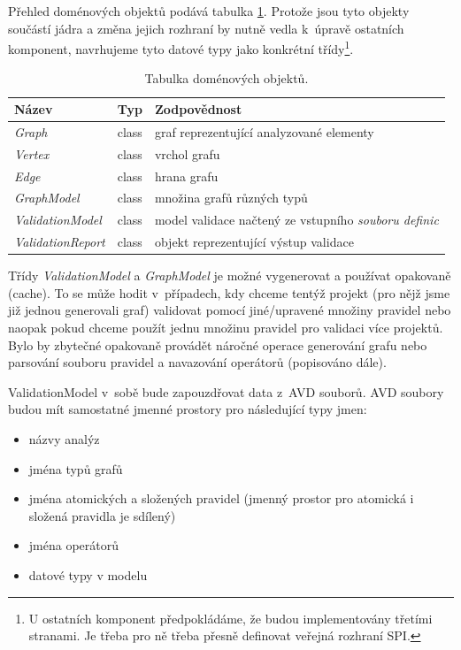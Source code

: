 Přehled doménových objektů podává tabulka \ref{design-domain_object_table}. Protože jsou tyto objekty součástí jádra a změna jejich rozhraní by nutně vedla k~úpravě ostatních komponent, navrhujeme tyto datové typy jako konkrétní třídy\footnote{U ostatních komponent předpokládáme, že budou implementovány třetími stranami. Je třeba pro ně třeba přesně definovat veřejná rozhraní SPI.}.

\begin{table}[h]
  \caption{Tabulka doménových objektů. \label{design-domain_object_table}}
  \begin{center}
    \begin{tabular}{| l | c | p{8cm} |}
      \hline
      \textbf{Název} & \textbf{Typ} & \textbf{Zodpovědnost} \\
      \hline
      \hline
      \emph{Graph} & class & graf reprezentující analyzované elementy \\ \hline
      \emph{Vertex} & class &  vrchol grafu \\ \hline
      \emph{Edge} & class & hrana grafu \\ \hline
      \emph{GraphModel} & class & množina grafů různých typů \\ \hline
      \hline
      \emph{ValidationModel} & class & model validace načtený ze vstupního \emph{souboru definic} \\ \hline
      \hline
      \emph{ValidationReport} & class &  objekt reprezentující výstup validace\\ \hline
    \end{tabular}
  \end{center}

\end{table}

Třídy \emph{ValidationModel} a \emph{GraphModel} je možné vygenerovat a používat opakovaně (cache). To se může hodit v~případech, kdy chceme tentýž projekt (pro nějž jsme již jednou generovali graf) validovat pomocí jiné/upravené množiny pravidel nebo naopak pokud chceme použít jednu množinu pravidel pro validaci více projektů. Bylo by zbytečné opakovaně provádět náročné operace generování grafu nebo parsování souboru pravidel a navazování operátorů (popisováno dále).

ValidationModel v~sobě bude zapouzdřovat data z~AVD souborů. AVD soubory budou mít samostatné jmenné prostory pro následující typy jmen:

\begin{itemize}
\item názvy analýz
\item jména typů grafů
\item jména atomických a složených pravidel (jmenný prostor pro atomická i složená pravidla je sdílený)
\item jména operátorů
\item datové typy v modelu
\end{itemize}

